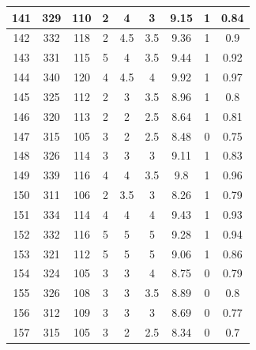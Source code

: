 \documentclass[11pt]{article}
\begin{document}
\begin{appendix}
\begin{longtable}[H]{|c|c|c|c|c|c|c|c|c|}
	141        & 329       & 110         & 2                 & 4   & 3   & 9.15 & 1        & 0.84            \\ \hline
	142        & 332       & 118         & 2                 & 4.5 & 3.5 & 9.36 & 1        & 0.9             \\ \hline
	143        & 331       & 115         & 5                 & 4   & 3.5 & 9.44 & 1        & 0.92            \\ \hline
	144        & 340       & 120         & 4                 & 4.5 & 4   & 9.92 & 1        & 0.97            \\ \hline
	145        & 325       & 112         & 2                 & 3   & 3.5 & 8.96 & 1        & 0.8             \\ \hline
	146        & 320       & 113         & 2                 & 2   & 2.5 & 8.64 & 1        & 0.81            \\ \hline
	147        & 315       & 105         & 3                 & 2   & 2.5 & 8.48 & 0        & 0.75            \\ \hline
	148        & 326       & 114         & 3                 & 3   & 3   & 9.11 & 1        & 0.83            \\ \hline
	149        & 339       & 116         & 4                 & 4   & 3.5 & 9.8  & 1        & 0.96            \\ \hline
	150        & 311       & 106         & 2                 & 3.5 & 3   & 8.26 & 1        & 0.79            \\ \hline
	151        & 334       & 114         & 4                 & 4   & 4   & 9.43 & 1        & 0.93            \\ \hline
	152        & 332       & 116         & 5                 & 5   & 5   & 9.28 & 1        & 0.94            \\ \hline
	153        & 321       & 112         & 5                 & 5   & 5   & 9.06 & 1        & 0.86            \\ \hline
	154        & 324       & 105         & 3                 & 3   & 4   & 8.75 & 0        & 0.79            \\ \hline
	155        & 326       & 108         & 3                 & 3   & 3.5 & 8.89 & 0        & 0.8             \\ \hline
	156        & 312       & 109         & 3                 & 3   & 3   & 8.69 & 0        & 0.77            \\ \hline
	157        & 315       & 105         & 3                 & 2   & 2.5 & 8.34 & 0        & 0.7             \\ \hline

\end{longtable}
\end{appendix}
\end{document}
